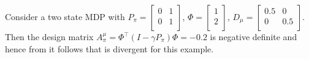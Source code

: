 \begin{example}
Consider a two state MDP with $P_\pi=
\begin{bmatrix}
    0       & 1  \\
    0       & 1 \\
\end{bmatrix}$, $\Phi=\begin{bmatrix}
 1  \\
2 \\
\end{bmatrix}$, $D_\mu=
\begin{bmatrix}
    0.5       & 0  \\
    0       &0.5 \\
\end{bmatrix}$. Then the design matrix $A^\mu_\pi=\Phi^\top(I-\gamma P_\pi)\Phi=-0.2$ is negative definite and hence from  it follows that \tdo is divergent for this example.
\end{example}
%
